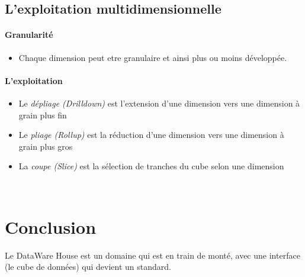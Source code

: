 \documentclass[a4paper,11pt]{article}
\begin{document}
		\subsection{L'exploitation multidimensionnelle}
		\paragraph{Granularité}
			\begin{itemize}
				\item Chaque dimension peut etre granulaire et ainsi plus ou moins développée.
			\end{itemize}
		
		\paragraph{L'exploitation}
			\begin{itemize}
				\item Le \emph{dépliage (Drilldown)} est l'extension d'une dimension vers une dimension à grain plus fin
				\item Le \emph{pliage (Rollup)} est la réduction d'une dimension vers une dimension à grain plus gros
				\item La \emph{coupe (Slice)} est la sélection de tranches du cube selon une dimension
				\end{itemize}
				~\\
				
		\section{Conclusion}
		
		Le DataWare House est un domaine qui est en train de monté, avec une interface (le cube de données) qui devient un standard.
				
				
		
\end{document}
